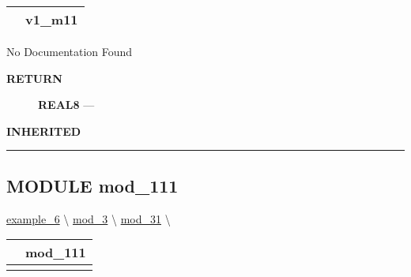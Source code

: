 {\renewcommand{\arraystretch}{1.5}
\begin{tabularx}{\textwidth}{|>{\raggedright\arraybackslash}l|X|}
\hline
\hspace{0pt}\mytexttt{\color{red} } & \textbf{v1\_m11} \\
\hline
\end{tabularx}
}

\par





No Documentation Found








\par
\begin{description}
\item [\colorbox{tagtype}{\color{white} \textbf{\textsf{RETURN}}}] \textbf{REAL8} --- 
\end{description}






\par
\begin{description}
\item [\colorbox{tagtype}{\color{white} \textbf{\textsf{INHERITED}}}] 
\end{description}



\rule{\linewidth}{0.5pt}
\subsection*{\textsf{\colorbox{headtoc}{\color{white} MODULE}
mod\_111}}

\hypertarget{ecldoc:intest.inintest.example_6.mod_1.mod_11.mod_111}{}
\hspace{0pt} \hyperlink{ecldoc:intest.inintest.example_6}{example_6} \textbackslash 
\hspace{0pt} \hyperlink{ecldoc:intest.inintest.example_6.mod_3}{mod_3} \textbackslash 
\hspace{0pt} \hyperlink{ecldoc:intest.inintest.example_6.mod_3.mod_31}{mod_31} \textbackslash 

{\renewcommand{\arraystretch}{1.5}
\begin{tabularx}{\textwidth}{|>{\raggedright\arraybackslash}l|X|}
\hline
\hspace{0pt}\mytexttt{\color{red} } & \textbf{mod\_111} \\
\hline
\multicolumn{2}{|>{\raggedright\arraybackslash}X|}{\hspace{0pt}\mytexttt{\color{param} (real8 a\_111)}} \\
\hline
\end{tabularx}
}

